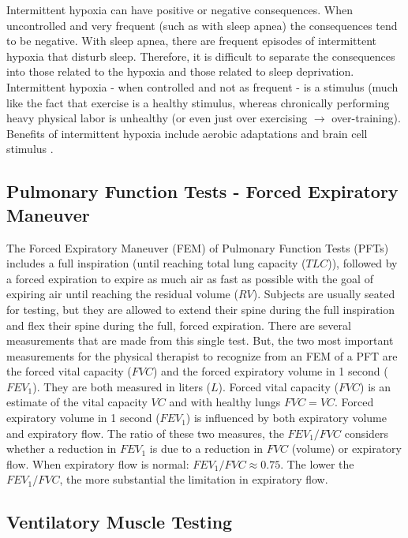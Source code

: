 Intermittent hypoxia can have positive or negative consequences. When uncontrolled and very frequent (such as with sleep apnea) the consequences tend to be negative. With sleep apnea, there are frequent episodes of intermittent hypoxia that disturb sleep. Therefore, it is difficult to separate the consequences into those related to the hypoxia and those related to sleep deprivation.
Intermittent hypoxia - when controlled and not as frequent - is a stimulus (much like the fact that exercise is a healthy stimulus, whereas chronically performing heavy physical labor is unhealthy (or even just over exercising $\rightarrow$ over-training). Benefits of intermittent hypoxia include aerobic adaptations and brain cell stimulus \cite{navarrete-opazo_therapeutic_2014, verges_hypoxic_2015}.

\subsection{Pulmonary Function Tests - Forced Expiratory Maneuver}

The Forced Expiratory Maneuver (FEM) of Pulmonary Function Tests (PFTs) includes a full inspiration (until reaching total lung capacity ($TLC$)), followed by a forced expiration to expire as much air as fast as possible with the goal of expiring air until reaching the residual volume ($RV$). Subjects are usually seated for testing, but they are allowed to extend their spine during the full inspiration and flex their spine during the full, forced expiration. There are several measurements that are made from this single test. But, the two most important measurements for the physical therapist to recognize from an FEM of a PFT are the forced vital capacity ($FVC$) and the forced expiratory volume in 1 second ($FEV_1$). They are both measured in liters ($L$). 
Forced vital capacity ($FVC$) is an estimate of the vital capacity $VC$ and with healthy lungs $FVC = VC$. Forced expiratory volume in 1 second ($FEV_1$) is influenced by both expiratory volume and expiratory flow. The ratio of these two measures, the $FEV_1/FVC$ considers whether a reduction in $FEV_1$ is due to a reduction in $FVC$ (volume) or expiratory flow. When expiratory flow is normal: $FEV_1/FVC \approx 0.75$. The lower the $FEV_1/FVC$, the more substantial the limitation in expiratory flow.

\subsection{Ventilatory Muscle Testing}

